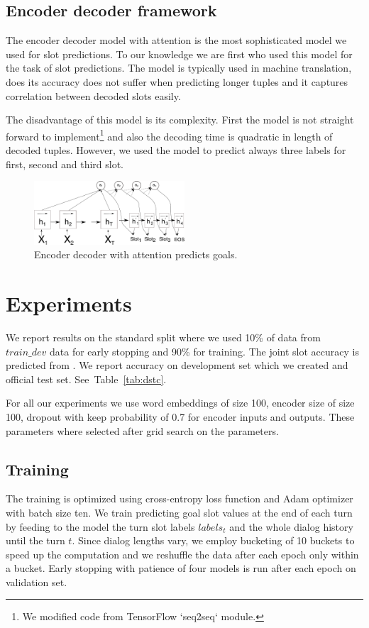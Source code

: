 \documentclass{itatnew}
\begin{document}
\subsection{Encoder decoder framework}
\label{sec:encdec}
The encoder decoder model with attention\cite{bahdanau2014neural} is the most sophisticated model we used for slot predictions.
To our knowledge we are first who used this model for the task of slot predictions.
The model is typically used in machine translation, does its accuracy does not suffer when predicting longer tuples\cite{bahdanau2014neural} and it captures correlation between decoded slots easily.

The disadvantage of this model is its complexity.
First the model is not straight forward to implement\footnote{We modified code from TensorFlow `seq2seq` module.} and also the decoding time is quadratic in length of decoded tuples.
However, we used the model to predict always three labels for first, second and third slot.
\begin{figure}
\includegraphics[width=0.5\textwidth]{encdec}
\caption{Encoder decoder with attention predicts goals.}
\label{fig:encdec}
\end{figure}

\section{Experiments}
\label{sec:exp}
We report results on the standard split where we used 10\% of data from $train\_dev$ data for early stopping\cite{prechelt1998early} and 90\% for training.
The joint slot accuracy is predicted from .
We report accuracy  on development set which we created and official test set. See~Table~\ref{tab:dstc}.

For all our experiments we use word embeddings of size 100, encoder size of size 100, dropout with keep probability of 0.7 for encoder inputs and outputs.
These parameters where selected after grid search on the parameters.

\subsection{Training}
\label{sec:train}
The training is optimized using cross-entropy loss function and Adam optimizer\cite{kingma2014adam} with batch size ten.
We train predicting goal slot values at the end of each turn by feeding to the model the turn slot labels $labels_t$ and the whole dialog history until the turn $t$.
Since dialog lengths vary, we employ bucketing of 10 buckets to speed up the computation and we reshuffle the data after each epoch only within a bucket.
Early stopping with patience of four models is run after each epoch on validation set.
\end{document}
